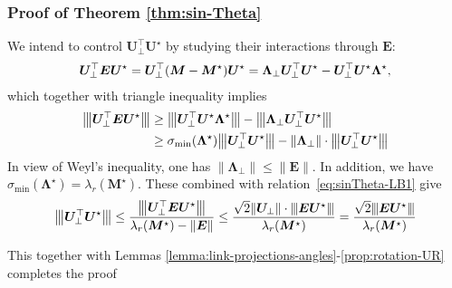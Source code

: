 \documentclass[compress,
mathserif,wide,%
]{beamer}
\begin{document}
\begin{frame}
\frametitle{Proof of  Theorem \ref{thm:sin-Theta}}


	We intend to control $\bm{U}_{\perp}^{\top} \bm{U}^\star$ by studying their interactions through $\bm{E}$:	
\begin{align*}
	\bm{U}_{\perp}^{\top} \bm{E} {\bm U}^\star=\bm{U}_{\perp}^{\top} ({\bm M} - {\bm M}^\star) {\bm U}^\star = \bm{\Lambda}_{\perp}\bm{U}_{\perp}^{\top}\bm{U}^{\star}-\bm{U}_{\perp}^{\top}\bm{U}^{\star}\bm{\Lambda}^{\star},
\end{align*}
which together with triangle inequality implies
\begin{align} \label{eq:sinTheta-LB1}
\vertiiibig{\bm{U}_{\perp}^{\top}\bm{E}\bm{U}^\star} & \geq \vertiiibig{\bm{U}_{\perp}^{\top}\bm{U}^{\star}\bm{\Lambda}^{\star}} - \vertiiibig{\bm{\Lambda}_{\perp}\bm{U}_{\perp}^{\top}\bm{U}^{\star}} \nonumber \\
	& \geq  \sigma_{\min}(\bm{\Lambda}^\star)  \vertiiibig{\bm{U}_{\perp}^{\top}\bm{U}^{\star}}- \|\bm{\Lambda}_{\perp}\| \cdot \vertiiibig{\bm{U}_{\perp}^{\top}\bm{U}^{\star}}
\end{align}
%
	In view of Weyl's inequality, one has $\|\bm{\Lambda}_{\perp}\|\leq\|\bm{E}\|$. In addition, we have $ \sigma_{\min}(\bm{\Lambda}^\star) = \lambda_{r}(\bm{M}^\star)$. These combined with relation~\eqref{eq:sinTheta-LB1} give
%
\[
	{\big\vert\kern-0.25ex\big\vert\kern-0.25ex\big\vert \bm{U}_{\perp}^{\top}\bm{U}^{\star} \big\vert\kern-0.25ex\big\vert\kern-0.25ex\big\vert}
	\leq\frac{{\big\vert\kern-0.25ex\big\vert\kern-0.25ex\big\vert \bm{U}_{\perp}^{\top}\bm{E}\bm{U}^\star \big\vert\kern-0.25ex\big\vert\kern-0.25ex\big\vert} }{\lambda_{r}(\bm{M}^\star) - \|\bm{E}\|}
	\leq\frac{ \sqrt{2} \| \bm{U}_{\perp} \| \cdot {\left\vert\kern-0.25ex\left\vert\kern-0.25ex\left\vert   \bm{E} \bm{U}^{\star}  \right\vert\kern-0.25ex\right\vert\kern-0.25ex\right\vert}}{\lambda_{r}(\bm{M}^{\star})}
	= \frac{  \sqrt{2}  {\left\vert\kern-0.25ex\left\vert\kern-0.25ex\left\vert   \bm{E} \bm{U}^{\star}  \right\vert\kern-0.25ex\right\vert\kern-0.25ex\right\vert} }{\lambda_{r}(\bm{M}^{\star})}
\]

This together with Lemmas \ref{lemma:link-projections-angles}-\ref{prop:rotation-UR} completes the proof


\end{frame}
\end{document}
